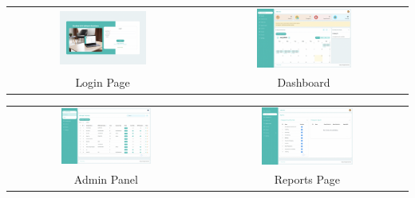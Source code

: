 \begin{center}
    \begin{tabular}{cc}
    \includegraphics[width=0.475\textwidth]{images/Chapter4/Evv/login_mid.png} & \includegraphics[width=0.475\textwidth]{images/Chapter4/Evv/dashboard_mid.png} \\
    Login Page & Dashboard \\
    \end{tabular}
\end{center}

\begin{center}
    \begin{tabular}{cc}
    \includegraphics[width=0.475\textwidth]{images/Chapter4/Evv/admin_panel_mid.png} & \includegraphics[width=0.475\textwidth]{images/Chapter4/Evv/report_mid.png} \\
    Admin Panel & Reports Page \\
    \end{tabular}
\end{center}

